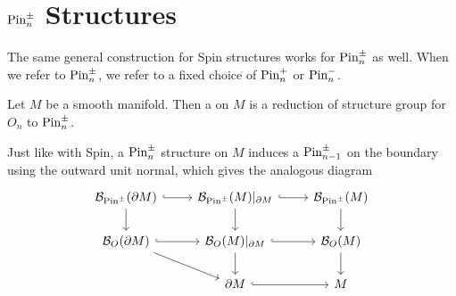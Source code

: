 %
\section{$\mathrm{Pin}^\pm_n$ Structures}
%
The same general construction for Spin structures works for $\mathrm{Pin}^\pm_n$ as well.
When we refer to $\mathrm{Pin}^\pm_n$, we refer to a fixed choice of $\mathrm{Pin}^+_n$ or
$\mathrm{Pin}^-_n$.
%
\begin{defn}
Let $M$ be a smooth manifold. Then a  on $M$ is
a reduction of structure group for $O_n$ to $\mathrm{Pin}^\pm_n$.
\end{defn}
%
Just like with Spin, a $\mathrm{Pin}^\pm_n$ structure on $M$ induces a $\mathrm{Pin}^\pm_{n-1}$
on the boundary using the outward unit normal, which gives the analogous diagram
\[\begin{tikzcd}
\B_{\Pin^\pm}(\partial M) \ar[d]\ar[r, hookrightarrow] & \B_{\Pin^\pm}(M)\vert_{\partial M}
\ar[d]\ar[r, hookrightarrow] & \B_{\Pin^\pm}(M) \ar[d]\\
\B_O(\partial M) \ar[dr]\ar[r, hookrightarrow] & \B_O(M)\vert_{\partial M}
\ar[d]\ar[r, hookrightarrow] & \B_O(M) \ar[d]\\
& \partial M \ar[r, hookrightarrow]& M
\end{tikzcd}\]
%

